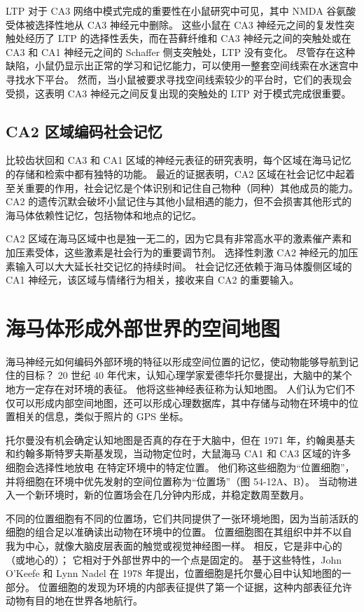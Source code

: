 LTP 对于 CA3 网络中模式完成的重要性在小鼠研究中可见，其中 NMDA 谷氨酸受体被选择性地从 CA3 神经元中删除。 这些小鼠在 CA3 神经元之间的复发性突触处经历了 LTP 的选择性丢失，而在苔藓纤维和 CA3 神经元之间的突触处或在 CA3 和 CA1 神经元之间的 Schaffer 侧支突触处，LTP 没有变化。 尽管存在这种缺陷，小鼠仍显示出正常的学习和记忆能力，可以使用一整套空间线索在水迷宫中寻找水下平台。 然而，当小鼠被要求寻找空间线索较少的平台时，它们的表现会受损，这表明 CA3 神经元之间反复出现的突触处的 LTP 对于模式完成很重要。

\subsection{CA2 区域编码社会记忆}

比较齿状回和 CA3 和 CA1 区域的神经元表征的研究表明，每个区域在海马记忆的存储和检索中都有独特的功能。 最近的证据表明，CA2 区域在社会记忆中起着至关重要的作用，社会记忆是个体识别和记住自己物种（同种）其他成员的能力。 CA2 的遗传沉默会破坏小鼠记住与其他小鼠相遇的能力，但不会损害其他形式的海马体依赖性记忆，包括物体和地点的记忆。

CA2 区域在海马区域中也是独一无二的，因为它具有非常高水平的激素催产素和加压素受体，这些激素是社会行为的重要调节剂。 选择性刺激 CA2 神经元的加压素输入可以大大延长社交记忆的持续时间。 社会记忆还依赖于海马体腹侧区域的 CA1 神经元，该区域与情绪行为相关，接收来自 CA2 的重要输入。

\section{海马体形成外部世界的空间地图}
海马神经元如何编码外部环境的特征以形成空间位置的记忆，使动物能够导航到记住的目标？ 20 世纪 40 年代末，认知心理学家爱德华托尔曼提出，大脑中的某个地方一定存在对环境的表征。 他将这些神经表征称为认知地图。 人们认为它们不仅可以形成内部空间地图，还可以形成心理数据库，其中存储与动物在环境中的位置相关的信息，类似于照片的 GPS 坐标。

托尔曼没有机会确定认知地图是否真的存在于大脑中，但在 1971 年，约翰奥基夫和约翰多斯特罗夫斯基发现，当动物定位时，大鼠海马 CA1 和 CA3 区域的许多细胞会选择性地放电 在特定环境中的特定位置。 他们称这些细胞为“位置细胞”，并将细胞在环境中优先发射的空间位置称为“位置场”（图 54-12A、B）。 当动物进入一个新环境时，新的位置场会在几分钟内形成，并稳定数周至数月。

不同的位置细胞有不同的位置场，它们共同提供了一张环境地图，因为当前活跃的细胞的组合足以准确读出动物在环境中的位置。 位置细胞图在其组织中并不以自我为中心，就像大脑皮层表面的触觉或视觉神经图一样。 相反，它是非中心的（或地心的）； 它相对于外部世界中的一个点是固定的。 基于这些特性，John O’Keefe 和 Lynn Nadel 在 1978 年提出，位置细胞是托尔曼心目中认知地图的一部分。 位置细胞的发现为环境的内部表征提供了第一个证据，这种内部表征允许动物有目的地在世界各地航行。

